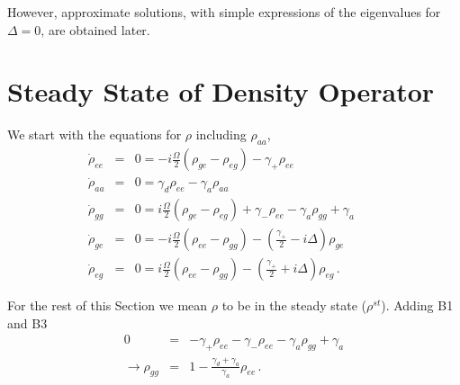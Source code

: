 \documentclass[twocolumn,aps,eqsecnum,showkeys,amsmath]{revtex4-2}
\begin{document}
However, approximate solutions, with simple expressions of the eigenvalues 
for $\Delta=0$, are obtained later. 


\section{Steady State of Density Operator} 
We start with the equations for $\rho$ including $\rho_{aa}$,
%
\begin{eqnarray}
\dot{\rho}_{ee} &=& 0 = -i\frac{\Omega}{2} (\rho_{ge} -\rho_{eg})
 	-\gamma_+ \rho_{ee}	\\ 
\dot{\rho}_{aa} &=& 0 = \gamma_d \rho_{ee} -\gamma_a \rho_{aa} \\
\dot{\rho}_{gg} &=& 0 = i\frac{\Omega}{2} (\rho_{ge} -\rho_{eg})  
 +\gamma_- \rho_{ee} -\gamma_a \rho_{gg} +\gamma_a   \qquad \\
\dot{\rho}_{ge} &=& 0 = -i\frac{\Omega}{2} (\rho_{ee} -\rho_{gg})
	-\left( \frac{\gamma_+}{2} -i\Delta \right) \rho_{ge} 	\\
\dot{\rho}_{eg} &=& 0 = i\frac{\Omega}{2} (\rho_{ee} -\rho_{gg})
	-\left( \frac{\gamma_+}{2} +i\Delta \right) \rho_{eg} 	\,.
\end{eqnarray}

For the rest of this Section we mean $\rho$ to be in the steady 
state ($\rho^{st}$). Adding B1 and B3 
%
\begin{eqnarray}
0 &=& -\gamma_+ \rho_{ee} - \gamma_- \rho_{ee} 
	-\gamma_a \rho_{gg} +\gamma_a 		\nonumber \\
\to \rho_{gg} &=& 1- \frac{\gamma_d +\gamma_a}{\gamma_a} \rho_{ee} \,.
\end{eqnarray}
\end{document}
